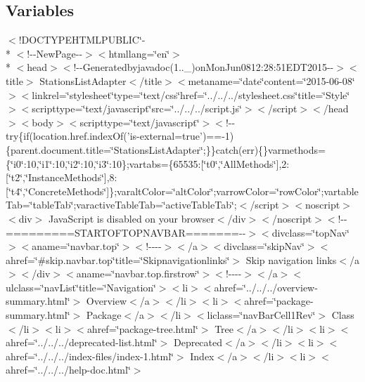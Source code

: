 \subsection*{Variables}
\begin{DoxyCompactItemize}
\item 
$<$!D\-O\-C\-T\-Y\-P\-E\-H\-T\-M\-L\-P\-U\-B\-L\-I\-C\char`\"{}-\/\\*
$<$!-\/-\/New\-Page-\/-\/$>$$<$htmllang=\char`\"{}en\char`\"{}$>$\\*
$<$head$>$$<$!-\/-\/Generatedbyjavadoc(1..\-\_)on\-Mon\-Jun0812\-:28\-:51\-E\-D\-T2015-\/-\/$>$$<$title$>$ Stations\-List\-Adapter$<$/title$>$$<$metaname=\char`\"{}date\char`\"{}content=\char`\"{}2015-\/06-\/08\char`\"{}$>$$<$linkrel=\char`\"{}stylesheet\char`\"{}type=\char`\"{}text/css\char`\"{}href=\char`\"{}../../../stylesheet.\-css\char`\"{}title=\char`\"{}\-Style\char`\"{}$>$$<$scripttype=\char`\"{}text/javascript\char`\"{}src=\char`\"{}../../../script.\-js\char`\"{}$>$$<$/script$>$$<$/head$>$$<$body$>$$<$scripttype=\char`\"{}text/javascript\char`\"{}$>$$<$!-\/-\/try\{if(location.\-href.\-index\-Of('is-\/external=true')==-\/1)\{parent.\-document.\-title=\char`\"{}\-Stations\-List\-Adapter\char`\"{};\}\}catch(err)\{\}varmethods=\{\char`\"{}i0\char`\"{}\-:10,\char`\"{}i1\char`\"{}\-:10,\char`\"{}i2\char`\"{}\-:10,\char`\"{}i3\char`\"{}\-:10\};vartabs=\{65535\-:\mbox{[}\char`\"{}t0\char`\"{},\char`\"{}\-All\-Methods\char`\"{}\mbox{]},2\-:\mbox{[}\char`\"{}t2\char`\"{},\char`\"{}\-Instance\-Methods\char`\"{}\mbox{]},8\-:\mbox{[}\char`\"{}t4\char`\"{},\char`\"{}\-Concrete\-Methods\char`\"{}\mbox{]}\};varalt\-Color=\char`\"{}alt\-Color\char`\"{};varrow\-Color=\char`\"{}row\-Color\char`\"{};vartable\-Tab=\char`\"{}table\-Tab\char`\"{};varactive\-Table\-Tab=\char`\"{}active\-Table\-Tab\char`\"{};$<$/script$>$$<$noscript$>$$<$div$>$ Java\-Script is disabled on your browser$<$/div$>$$<$/noscript$>$$<$!-\/-\/=========\-S\-T\-A\-R\-T\-O\-F\-T\-O\-P\-N\-A\-V\-B\-A\-R=======-\/-\/$>$$<$divclass=\char`\"{}top\-Nav\char`\"{}$>$$<$aname=\char`\"{}navbar.\-top\char`\"{}$>$$<$!-\/-\/-\/-\/$>$$<$/a$>$$<$divclass=\char`\"{}skip\-Nav\char`\"{}$>$$<$ahref=\char`\"{}\#skip.\-navbar.\-top\char`\"{}title=\char`\"{}\-Skipnavigationlinks\char`\"{}$>$ Skip navigation links$<$/a$>$$<$/div$>$$<$aname=\char`\"{}navbar.\-top.\-firstrow\char`\"{}$>$$<$!-\/-\/-\/-\/$>$$<$/a$>$$<$ulclass=\char`\"{}nav\-List\char`\"{}title=\char`\"{}\-Navigation\char`\"{}$>$$<$li$>$$<$ahref=\char`\"{}../../../overview-\/summary.\-html\char`\"{}$>$ Overview$<$/a$>$$<$/li$>$$<$li$>$$<$ahref=\char`\"{}package-\/summary.\-html\char`\"{}$>$ Package$<$/a$>$$<$/li$>$$<$liclass=\char`\"{}nav\-Bar\-Cell1\-Rev\char`\"{}$>$ Class$<$/li$>$$<$li$>$$<$ahref=\char`\"{}package-\/tree.\-html\char`\"{}$>$ Tree$<$/a$>$$<$/li$>$$<$li$>$$<$ahref=\char`\"{}../../../deprecated-\/list.\-html\char`\"{}$>$ Deprecated$<$/a$>$$<$/li$>$$<$li$>$$<$ahref=\char`\"{}../../../index-\/files/index-\/1.\-html\char`\"{}$>$ Index$<$/a$>$$<$/li$>$$<$li$>$$<$ahref=\char`\"{}../../../help-\/doc.\-html\char`\"{}$>$ $$
\end{DoxyCompactItemize}
